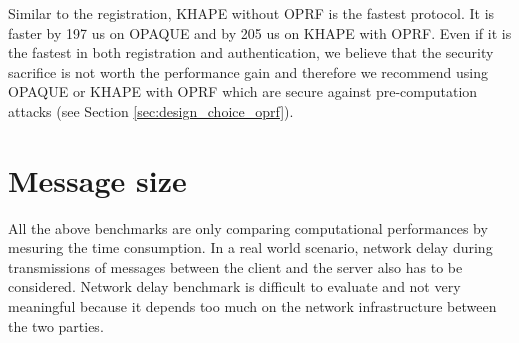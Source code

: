 \documentclass[../report.tex]{subfiles}
\begin{document}
Similar to the registration, KHAPE without OPRF is the fastest protocol. It is faster by 197 us on OPAQUE and by 205 us on KHAPE with OPRF.
Even if it is the fastest in both registration and authentication, we believe that the security sacrifice is not worth the performance gain and therefore we recommend using OPAQUE or KHAPE with OPRF which are secure against pre-computation attacks (see Section \ref{sec:design_choice_oprf}).







\section{Message size} \label{sec:comp_message_size}

All the above benchmarks are only comparing computational performances by mesuring the time consumption. In a real world scenario, network delay during transmissions of messages between the client and the server also has to be considered. Network delay benchmark is difficult to evaluate and not very meaningful because it depends too much on the network infrastructure between the two parties.
\end{document}
